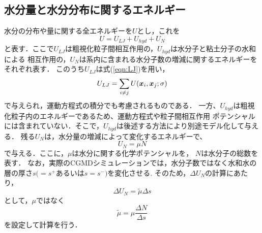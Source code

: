 \subsection{水分量と水分分布に関するエネルギー}
水分の分布や量に関する全エネルギーを$U$とし，これを
\begin{equation}
	U=U_{LJ} +U_{hyd} + U_N
	\label{eqn:}
\end{equation}
と表す．ここで$U_{LJ}$は粗視化粒子間相互作用の，$U_{hyd}$は水分子と粘土分子の水和による
相互作用の，$U_N$は系内に含まれる水分子数の増減に関するエネルギーをそれぞれ表す．
このうち$U_{LJ}$は式(\ref{eqn:LJ})を用い，
\begin{equation}
	U_{LJ}=\sum_{i\neq j} U(\mbox{\boldmath $x$}_i,\mbox{\boldmath $x$}_j;\sigma)
	\label{eqn:}
\end{equation}
で与えられ，運動方程式の積分でも考慮されるものである．
一方、$U_{hyd}$は粗視化粒子内のエネルギーであるため、運動方程式や粒子間相互作用
ポテンシャルには含まれていない．そこで，$U_{hyd}$は後述する方法により別途モデル化して与える．
残る$U_N$は，水分量の増減によって変化するエネルギーで、
\begin{equation}
	U_N=\mu N
	\label{eqn:U_N}
\end{equation}
で与える．ここに，$\mu$は水分に関する化学ポテンシャルを， $N$は水分子の総数を表す．
なお，実際のCGMDシミュレーションでは，水分子数ではなく水和水の層の厚さ$s(=s^{+}$あるいは$s=s^{-})$を変化させる. 
そのため，$\Delta U_N$の計算にあたり，
\begin{equation}
	\Delta U_N =\tilde \mu \Delta s
	\label{eqn:}
\end{equation}
として，$\mu$ではなく
\begin{equation}
	\tilde \mu =\mu \frac{\Delta N}{\Delta s}
	\label{eqn:}
\end{equation}
を設定して計算を行う．
